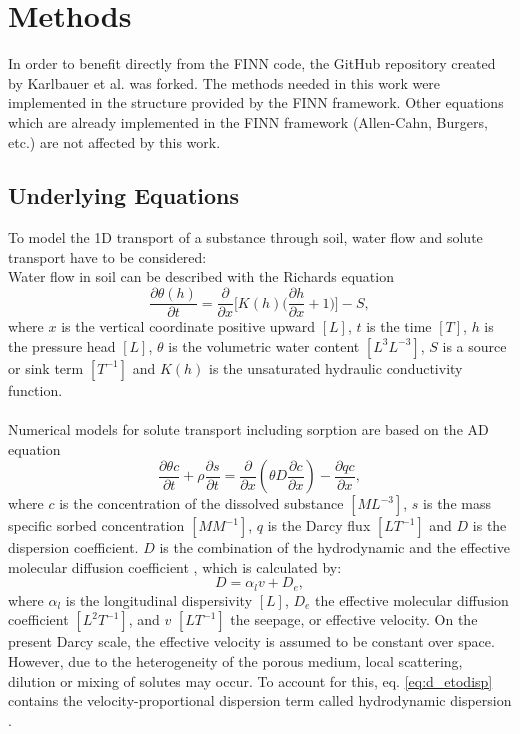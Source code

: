 \chapter{Methods}
In order to benefit directly from the FINN code, the GitHub repository created by Karlbauer et al. \cite{karlbauer2021composing} was forked. The methods needed in this work were implemented in the structure provided by the FINN framework. Other equations which are already implemented in the FINN framework (Allen-Cahn, Burgers, etc.) are not affected by this work.\\
\section{Underlying Equations}
To model the 1D transport of a substance through soil, water flow and solute transport have to be considered:\\
Water flow in soil can be described with the Richards equation \cite{Richards1931Nov}
\begin{equation}
    \frac{\partial \theta (h)}{\partial t} = \frac{\partial}{\partial x} \biggl [K(h)\biggl(\frac{\partial h}{\partial x} +1\biggr)\biggr] -S,
    \label{eq:richard}
\end{equation}
where $x$ is the vertical coordinate positive upward $[L]$, $t$ is the time $[T]$, $h$ is the pressure head $[L]$, $\theta$ is the volumetric water content $[L^3 L^{-3}]$, $S$ is a source or sink term $[T^{-1}]$ and $K(h)$ is the unsaturated hydraulic conductivity function.\\
\\
Numerical models for solute transport including sorption are based on the AD equation
\begin{equation}
    \frac{\partial \theta c}{\partial t} + \rho \frac{\partial s}{\partial t} = \frac{\partial }{\partial x} \left(\theta D \frac{\partial c}{\partial x} \right) - \frac{\partial qc}{\partial x},
    \label{eq:ad}
\end{equation}
where $c$ is the concentration of the dissolved substance $[M L^{-3}]$, $s$ is the mass specific sorbed concentration $[M M^{-1}]$, $q$ is the Darcy flux $[L T^{-1}]$ and $D$ is the dispersion coefficient. $D$ is the combination of the hydrodynamic and the effective molecular diffusion coefficient \cite{Scheidegger1961Oct}, which is calculated by:
\begin{equation}
    D = \alpha_lv + D_e,
    \label{eq:d_etodisp}
\end{equation}
where $\alpha_l$ is the longitudinal dispersivity $[L]$, $D_e$ the effective molecular diffusion coefficient $[L^2 T^{-1}]$, and $v$ $[LT^{-1}]$ the seepage, or effective velocity. On the present Darcy scale, the effective velocity is assumed to be constant over space. However, due to the heterogeneity of the porous medium, local scattering, dilution or mixing of solutes may occur. To account for this, eq. \ref{eq:d_etodisp} contains the velocity-proportional dispersion term called hydrodynamic dispersion \cite{Scheidegger1961Oct}.
